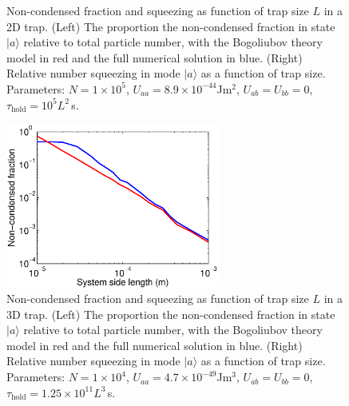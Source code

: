 \documentclass{iopart}
\begin{document}
\begin{figure}
\begin{subfigure}{.48\textwidth}
  \end{subfigure}
\caption{Non-condensed fraction and squeezing as function of trap size $L$ in a 2D trap. (Left) The proportion the non-condensed fraction in state $|a\rangle$ relative to total particle number, with the Bogoliubov theory model in red and the full numerical solution in blue. (Right) Relative number squeezing in mode $|a\rangle$ as a function of trap size. Parameters: $N=1\times 10^5$, $U_{aa} = 8.9\times 10^{-44}$Jm$^2$, $U_{ab}=U_{bb}=0$, $\tau_{\mathrm{hold}} = 10^{5} L^2$\,s.}
  \label{fig2D_squeezing_and_bog_scaling}
\end{figure}


\begin{figure}
  \centering
   \includegraphics[width=7cm]{figures/3D_Bog_mode_occupation_scaling.eps}
\caption{Non-condensed fraction and squeezing as function of trap size $L$ in a 3D trap. (Left) The proportion the non-condensed fraction in state $|a\rangle$ relative to total particle number, with the Bogoliubov theory model in red and the full numerical solution in blue. (Right) Relative number squeezing in mode $|a\rangle$ as a function of trap size. Parameters: $N=1\times 10^4$, $U_{aa} = 4.7\times 10^{-49}$Jm$^3$, $U_{ab}=U_{bb}=0$, $\tau_{\mathrm{hold}} = 1.25 \times 10^{11} L^3$\,s.}
 \label{fig3D_Bog_mode_occupation_scaling}
\end{figure}

\end{document}
